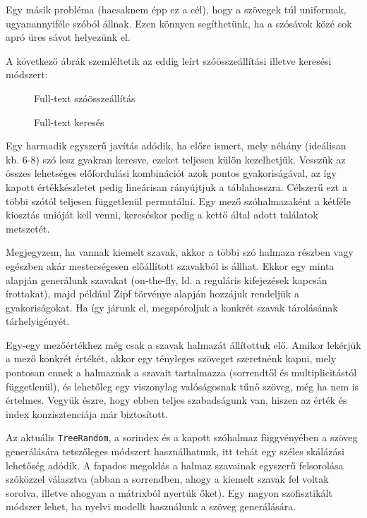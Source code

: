 \documentclass[
    parspace,
    noindent,
    nohyp,
]{elteiktdk}[2023/04/10]
\begin{document}
Egy másik probléma (hacsaknem épp ez a cél), hogy a szövegek túl uniformak, ugyanannyiféle szóból állnak.
Ezen könnyen segíthetünk, ha a szósávok közé sok apró üres sávot helyezünk el.

A következő ábrák szemléltetik az eddig leírt szóösszeállítási illetve keresési módszert:

\begin{figure}[H]
  \centering
  \hspace*{\fill}
  \begin{minipage}[t]{0.42\textwidth}
    
    \caption{Full-text szóösszeállítás}
  \end{minipage}
  \hspace*{\fill}
  \begin{minipage}[t]{0.42\textwidth}
    
    \caption{Full-text keresés}
  \end{minipage}
  \hspace*{\fill}
\end{figure}

Egy harmadik egyszerű javítás adódik,
ha előre ismert, mely néhány (ideálisan kb. 6-8) szó lesz gyakran keresve,
ezeket teljesen külön kezelhetjük.
Vesszük az összes lehetséges előfordulási kombinációt azok pontos gyakoriságával,
az így kapott értékkészletet pedig lineárisan rányújtjuk a táblahosszra.
Célszerű ezt a többi szótól teljesen függetlenül permutálni.
Egy mező szóhalmazaként a kétféle kiosztás unióját kell venni,
kereséskor pedig a kettő által adott találatok metszetét.

Megjegyzem, ha vannak kiemelt szavak, akkor a többi szó halmaza részben vagy egészben
akár mesterségesen előállított szavakból is állhat.
Ekkor egy minta alapján generálunk szavakat
(on-the-fly, ld. a reguláris kifejezések kapcsán írottakat),
majd például Zipf törvénye alapján hozzájuk rendeljük a gyakoriságokat.
Ha így járunk el, megspóroljuk a konkrét szavak tárolásának tárhelyigényét.

Egy-egy mezőértékhez még csak a szavak halmazát állítottuk elő.
Amikor lekérjük a mező konkrét értékét, akkor egy tényleges szöveget szeretnénk kapni,
mely pontosan ennek a halmaznak a szavait tartalmazza (sorrendtől és multiplicitástól függetlenül),
és lehetőleg egy viszonylag valóságosnak tűnő szöveg, még ha nem is értelmes.
Vegyük észre, hogy ebben teljes szabadságunk van, hiszen az érték és index konzisztenciája már biztosított.

Az aktuális \texttt{TreeRandom}, a sorindex és a kapott szóhalmaz függvényében
a szöveg generálására tetszőleges módszert használhatunk,
itt tehát egy széles skálázási lehetőség adódik.
A fapados megoldás a halmaz szavainak egyszerű felsorolása szóközzel választva
(abban a sorrendben, ahogy a kiemelt szavak fel voltak sorolva, illetve ahogyan a mátrixból nyertük őket).
Egy nagyon szofisztikált módszer lehet, ha nyelvi modellt használunk a szöveg generálására.
\end{document}
